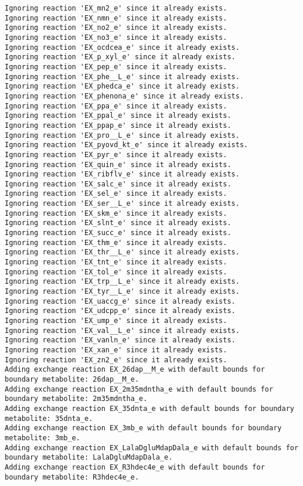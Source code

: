 \documentclass[
  letterpaper,
  DIV=11,
  numbers=noendperiod]{scrartcl}
\begin{document}
\begin{verbatim}
Ignoring reaction 'EX_mn2_e' since it already exists.
Ignoring reaction 'EX_nmn_e' since it already exists.
Ignoring reaction 'EX_no2_e' since it already exists.
Ignoring reaction 'EX_no3_e' since it already exists.
Ignoring reaction 'EX_ocdcea_e' since it already exists.
Ignoring reaction 'EX_p_xyl_e' since it already exists.
Ignoring reaction 'EX_pep_e' since it already exists.
Ignoring reaction 'EX_phe__L_e' since it already exists.
Ignoring reaction 'EX_phedca_e' since it already exists.
Ignoring reaction 'EX_phenona_e' since it already exists.
Ignoring reaction 'EX_ppa_e' since it already exists.
Ignoring reaction 'EX_ppal_e' since it already exists.
Ignoring reaction 'EX_ppap_e' since it already exists.
Ignoring reaction 'EX_pro__L_e' since it already exists.
Ignoring reaction 'EX_pyovd_kt_e' since it already exists.
Ignoring reaction 'EX_pyr_e' since it already exists.
Ignoring reaction 'EX_quin_e' since it already exists.
Ignoring reaction 'EX_ribflv_e' since it already exists.
Ignoring reaction 'EX_salc_e' since it already exists.
Ignoring reaction 'EX_sel_e' since it already exists.
Ignoring reaction 'EX_ser__L_e' since it already exists.
Ignoring reaction 'EX_skm_e' since it already exists.
Ignoring reaction 'EX_slnt_e' since it already exists.
Ignoring reaction 'EX_succ_e' since it already exists.
Ignoring reaction 'EX_thm_e' since it already exists.
Ignoring reaction 'EX_thr__L_e' since it already exists.
Ignoring reaction 'EX_tnt_e' since it already exists.
Ignoring reaction 'EX_tol_e' since it already exists.
Ignoring reaction 'EX_trp__L_e' since it already exists.
Ignoring reaction 'EX_tyr__L_e' since it already exists.
Ignoring reaction 'EX_uaccg_e' since it already exists.
Ignoring reaction 'EX_udcpp_e' since it already exists.
Ignoring reaction 'EX_ump_e' since it already exists.
Ignoring reaction 'EX_val__L_e' since it already exists.
Ignoring reaction 'EX_vanln_e' since it already exists.
Ignoring reaction 'EX_xan_e' since it already exists.
Ignoring reaction 'EX_zn2_e' since it already exists.
Adding exchange reaction EX_26dap__M_e with default bounds for boundary metabolite: 26dap__M_e.
Adding exchange reaction EX_2m35mdntha_e with default bounds for boundary metabolite: 2m35mdntha_e.
Adding exchange reaction EX_35dnta_e with default bounds for boundary metabolite: 35dnta_e.
Adding exchange reaction EX_3mb_e with default bounds for boundary metabolite: 3mb_e.
Adding exchange reaction EX_LalaDgluMdapDala_e with default bounds for boundary metabolite: LalaDgluMdapDala_e.
Adding exchange reaction EX_R3hdec4e_e with default bounds for boundary metabolite: R3hdec4e_e.

\end{verbatim}
\end{document}
